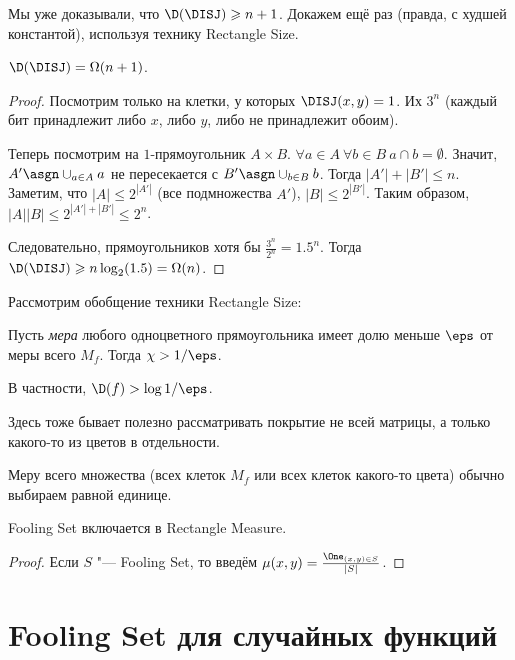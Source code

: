 Мы уже доказывали, что $\D(\DISJ) \geqslant n + 1$. Докажем ещё раз (правда, с худшей константой), используя технику Rectangle Size.
\begin{theorem}
$\D(\DISJ) = \Omega(n + 1)$.
\end{theorem}
\begin{proof}
Посмотрим только на клетки, у которых $\DISJ(x, y) = 1$. Их $3^n$ (каждый бит принадлежит либо $x$, либо $y$, либо не принадлежит обоим).

Теперь посмотрим на $1$-прямоугольник $A\times B$. $\forall a\in A\ \forall b\in B\ a\cap b = \emptyset$. Значит, $A' \asgn \cup_{a\in A} a$ не пересекается с $B'\asgn \cup_{b\in B} b$. Тогда $|A'|+|B'|\leqslant n$.
Заметим, что $|A|\leqslant 2^{|A'|}$ (все подмножества $A'$), $|B|\leqslant 2^{|B'|}$.
Таким образом, $|A||B|\leqslant 2^{|A'|+|B'|}\leqslant 2^n$.

Следовательно, прямоугольников хотя бы $\frac{3^n}{2^n} = 1.5^n$.
Тогда $\D(\DISJ)\geqslant n\log_2 (1.5) = \Omega(n)$.
\end{proof}

Рассмотрим обобщение техники Rectangle Size:
\begin{lemma}
Пусть \emph{мера} любого одноцветного прямоугольника имеет долю меньше $\eps$ от меры всего $M_f$. Тогда $\chi>1/\eps$.

В частности, $\D(f)>\log 1/\eps$.
\end{lemma}

\begin{remark}
Здесь тоже бывает полезно рассматривать покрытие не всей матрицы, а только какого-то из цветов в отдельности.
\end{remark}

\begin{remark}
Меру всего множества (всех клеток $M_f$ или всех клеток какого-то цвета) обычно выбираем равной единице.
\end{remark}

\begin{remark}
Fooling Set включается в Rectangle Measure.
\end{remark}
\begin{proof}
Если $S$ "--- Fooling Set, то введём $\mu(x, y) = \frac{\One_{(x, y)\in S}}{|S|}$.
\end{proof}

\section{Fooling Set для случайных функций}

